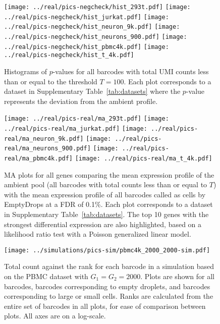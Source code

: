 \documentclass{article}
\begin{document}



\newpage
\begin{figure}[btp]
    \begin{center}
        \texttt{[image: ../real/pics-negcheck/hist\_293t.pdf]}
        \texttt{[image: ../real/pics-negcheck/hist\_jurkat.pdf]}
        \texttt{[image: ../real/pics-negcheck/hist\_neuron\_9k.pdf]}
        \texttt{[image: ../real/pics-negcheck/hist\_neurons\_900.pdf]}
        \texttt{[image: ../real/pics-negcheck/hist\_pbmc4k.pdf]}
        \texttt{[image: ../real/pics-negcheck/hist\_t\_4k.pdf]}
    \end{center}
    \caption{Histograms of $p$-values for all barcodes with total UMI counts less than or equal to the threshold $T=100$.
        Each plot corresponds to a dataset in Supplementary Table~\ref{tab:datasets} where the $p$-value represents the deviation from the ambient profile.
    }
    \label{fig:negative}
\end{figure}

\begin{figure}[btp]
    \begin{center}
        \texttt{[image: ../real/pics-real/ma\_293t.pdf]}
        \texttt{[image: ../real/pics-real/ma\_jurkat.pdf]}
        \texttt{[image: ../real/pics-real/ma\_neuron\_9k.pdf]}
        \texttt{[image: ../real/pics-real/ma\_neurons\_900.pdf]}
        \texttt{[image: ../real/pics-real/ma\_pbmc4k.pdf]}
        \texttt{[image: ../real/pics-real/ma\_t\_4k.pdf]}
    \end{center}
    \caption{MA plots for all genes comparing the mean expression profile of the ambient pool (all barcodes with total counts less than or equal to $T$) with the mean expression profile of all barcodes called as cells by EmptyDrops at a FDR of 0.1\%.
        Each plot corresponds to a dataset in Supplementary Table~\ref{tab:datasets}.
        The top 10 genes with the strongest differential expression are also highlighted, based on a likelihood ratio test with a Poisson generalized linear model.
    }
    \label{fig:ma}
\end{figure}

\begin{figure}[btp]
    \begin{center}
        \texttt{[image: ../simulations/pics-sim/pbmc4k\_2000\_2000-sim.pdf]}
    \end{center}
\caption{Total count against the rank for each barcode in a simulation based on the PBMC dataset with $G_1=G_2=2000$.
Plots are shown for all barcodes, barcodes corresponding to empty droplets, and barcodes corresponding to large or small cells.
Ranks are calculated from the entire set of barcodes in all plots, for ease of comparison between plots.
All axes are on a log-scale.}
\end{figure}
\end{document}
